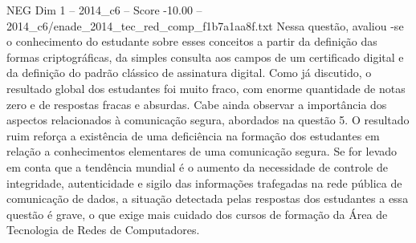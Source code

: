 \begin{textsample}{NEG Dim 1 – 2014\_c6 – Score -10.00 – 2014\_c6/enade\_2014\_tec\_red\_comp\_f1b7a1aa8f.txt}
Nessa questão, avaliou -se o conhecimento do estudante sobre esses conceitos a partir da definição das formas criptográficas, da simples consulta aos campos de um certificado digital e da definição do padrão clássico de assinatura digital.
Como já discutido, o resultado global dos estudantes foi muito fraco, com enorme quantidade de notas zero e de respostas fracas e absurdas.
Cabe ainda observar a importância dos aspectos relacionados à comunicação segura, abordados na questão 5.
O resultado ruim reforça a existência de uma deficiência na formação dos estudantes em relação a conhecimentos elementares de uma comunicação segura.
Se for levado em conta que a tendência mundial é o aumento da necessidade de controle de integridade, autenticidade e sigilo das informações trafegadas na rede pública de comunicação de dados, a situação detectada pelas respostas dos estudantes a essa questão é grave, o que exige mais cuidado dos cursos de formação da Área de Tecnologia de Redes de Computadores.

\end{textsample}
